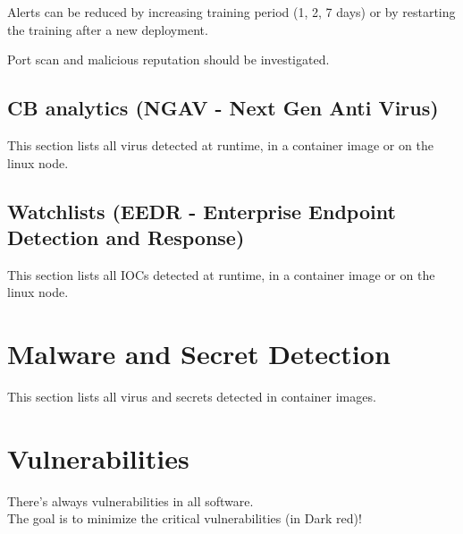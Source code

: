 \begin{tipblock}
	Alerts can be reduced by increasing training period (1, 2, 7 days) or by restarting the training after a new deployment.
\end{tipblock}

\begin{importantblock}
	Port scan and malicious reputation should be investigated.
\end{importantblock}



%

%

\vskip10pt


\vskip10pt



\subsection{CB analytics (NGAV - Next Gen Anti Virus)}
This section lists all virus detected at runtime, in a container image or on the linux node.

\subsection{Watchlists (EEDR - Enterprise Endpoint Detection and Response)}
This section lists all IOCs detected at runtime, in a container image or on the linux node.


\section{Malware and Secret Detection}
This section lists all virus and secrets detected in container images.



\section{Vulnerabilities}
There's always vulnerabilities in all software.\\
The goal is to minimize the critical vulnerabilities (in Dark red)!

